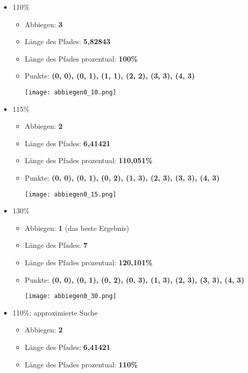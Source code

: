 \documentclass[a4paper,10pt,ngerman]{scrartcl}
\begin{document}
\begin{itemize}
  \item 110\%    
    \begin{itemize}
      \item Abbiegen: \textbf{3}
      \item Länge des Pfades: \textbf{5,82843}
      \item Länge des Pfades prozentual: \textbf{100\%}
      \item Punkte: \textbf{(0, 0), (0, 1), (1, 1), (2, 2), (3, 3), (4, 3)}
\begin{center}
\texttt{[image: abbiegen0\_10.png]}
\end{center}
    \end{itemize}
  \item 115\%    
    \begin{itemize}
      \item Abbiegen: \textbf{2}
      \item Länge des Pfades: \textbf{6,41421}
      \item Länge des Pfades prozentual: \textbf{110,051\%}
      \item Punkte: \textbf{(0, 0), (0, 1), (0, 2), (1, 3), (2, 3), (3, 3), (4, 3)}
\begin{center}
\texttt{[image: abbiegen0\_15.png]}
\end{center}
    \end{itemize}
  \item 130\%    
    \begin{itemize}
      \item Abbiegen: \textbf{1} (das beste Ergebnis)
      \item Länge des Pfades: \textbf{7}
      \item Länge des Pfades prozentual: \textbf{120,101\%}
      \item Punkte: \textbf{(0, 0), (0, 1), (0, 2), (0, 3), (1, 3), (2, 3), (3, 3), (4, 3)}
    \begin{center}
    \texttt{[image: abbiegen0\_30.png]}
    \end{center}
    \end{itemize}
  \item 110\%: approximierte Suche    
    \begin{itemize}
      \item Abbiegen: \textbf{2}
      \item Länge des Pfades: \textbf{6,41421}
      \item Länge des Pfades prozentual: \textbf{110\%}

\end{itemize}
\end{itemize}
\end{document}
